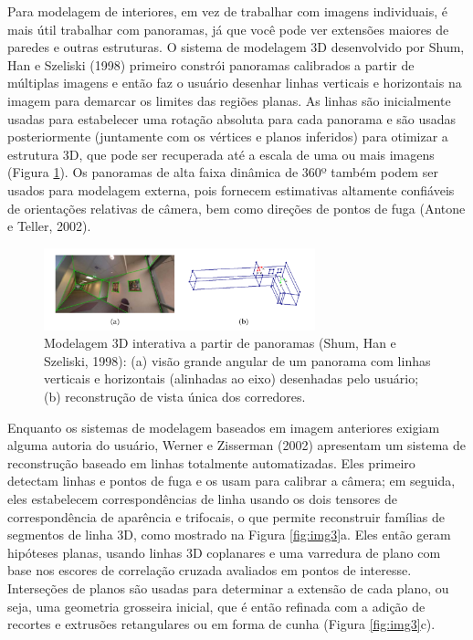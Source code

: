 \documentclass{article}
\begin{document}
Para modelagem de interiores, em vez de trabalhar com imagens individuais, é mais útil trabalhar com panoramas, já que você pode ver extensões maiores de paredes e outras estruturas. O sistema de modelagem 3D desenvolvido por Shum, Han e Szeliski (1998)\cite{Shum1998InteractiveCO} primeiro constrói panoramas calibrados a partir de múltiplas imagens e então faz o usuário desenhar linhas verticais e horizontais na imagem para demarcar os limites das regiões planas. As linhas são inicialmente usadas para estabelecer uma rotação absoluta para cada panorama e são usadas posteriormente (juntamente com os vértices e planos inferidos) para otimizar a estrutura 3D, que pode ser recuperada até a escala de uma ou mais imagens (Figura \ref{fig:img2}). Os panoramas de alta faixa dinâmica de 360º também podem ser usados para modelagem externa, pois fornecem estimativas altamente confiáveis de orientações relativas de câmera, bem como direções de pontos de fuga (Antone e Teller, 2002)\cite{Antone:2002:SEC:598434.598520}.

\begin{figure}[!htb]
    \centering
    \includegraphics[width=0.7\textwidth]{img2.png}
    \caption{Modelagem 3D interativa a partir de panoramas (Shum, Han e Szeliski, 1998)\cite{Shum1998InteractiveCO}: (a) visão grande angular de um panorama com linhas verticais e horizontais (alinhadas ao eixo) desenhadas pelo usuário; (b) reconstrução de vista única dos corredores.}
    \label{fig:img2}
\end{figure}

Enquanto os sistemas de modelagem baseados em imagem anteriores exigiam alguma autoria do usuário, Werner e Zisserman (2002)\cite{Werner} apresentam um sistema de reconstrução baseado em linhas totalmente automatizadas. Eles primeiro detectam linhas e pontos de fuga e os usam para calibrar a câmera; em seguida, eles estabelecem correspondências de linha usando os dois tensores de correspondência de aparência e trifocais, o que permite reconstruir famílias de segmentos de linha 3D, como mostrado na Figura \ref{fig:img3}a. Eles então geram hipóteses planas, usando linhas 3D coplanares e uma varredura de plano com base nos escores de correlação cruzada avaliados em pontos de interesse. Interseções de planos são usadas para determinar a extensão de cada plano, ou seja, uma geometria grosseira inicial, que é então refinada com a adição de recortes e extrusões retangulares ou em forma de cunha (Figura \ref{fig:img3}c).
\end{document}
